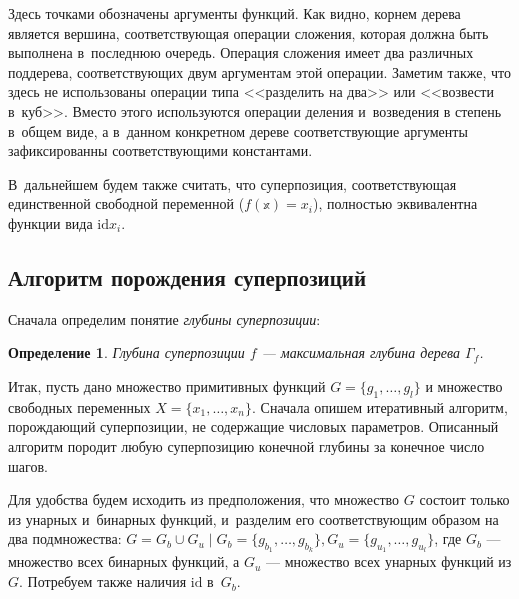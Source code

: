 \documentclass[12pt,a4paper]{amsart}
\newtheorem{defin}{Определение}
\begin{document}
Здесь точками обозначены аргументы функций. Как видно, корнем дерева является
вершина, соответствующая операции сложения, которая должна быть выполнена
в~последнюю очередь. Операция сложения имеет два различных поддерева,
соответствующих двум аргументам этой операции. Заметим также, что здесь не
использованы операции типа <<разделить на два>> или <<возвести в~куб>>.
Вместо этого используются операции деления и~возведения в степень в~общем
виде, а в~данном конкретном дереве соответствующие аргументы зафиксированны
соответствующими константами.

В~дальнейшем будем также считать, что суперпозиция, соответствующая
единственной свободной переменной ($f(\mathbb{x}) = x_i$), полностью
эквивалентна функции вида $\text{id} x_i$.

\subsection{Алгоритм порождения суперпозиций}

Сначала определим понятие \emph{глубины суперпозиции}:

\begin{defin}
  Глубина суперпозиции $f$ --- максимальная глубина дерева $\Gamma_f$.
\end{defin}

Итак, пусть дано множество примитивных функций $G = \{ g_1, \dots, g_l \}$ и
множество свободных переменных $X = \{ x_1, \dots, x_n \}$. Сначала
опишем итеративный алгоритм, порождающий суперпозиции, не содержащие числовых
параметров. Описанный алгоритм породит любую суперпозицию конечной глубины
за конечное число шагов.

Для удобства будем исходить из предположения, что множество $G$ состоит
только из унарных и~бинарных функций, и~разделим его соответствующим образом
на два подмножества:
$G = G_b \cup G_u \mid G_b = \{ g_{b_1}, \dots, g_{b_k} \}, G_u = \{ g_{u_1}, \dots, g_{u_l} \}$,
где $G_b$ --- множество всех бинарных функций, а $G_u$ --- множество всех
унарных функций из $G$. Потребуем также наличия $\text{id}$ в~$G_b$.
\end{document}
